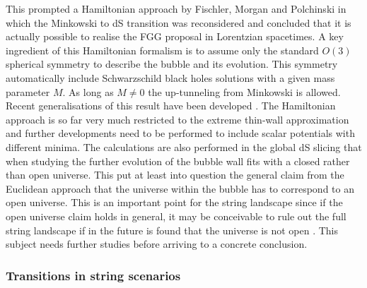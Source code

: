 \begin{itemize}
This prompted a Hamiltonian approach by Fischler, Morgan and Polchinski \cite{Fischler:1990pk} in which the Minkowski to dS transition was reconsidered and concluded that it is actually possible to realise the FGG proposal in Lorentzian spacetimes. A key ingredient of this Hamiltonian formalism is to assume only the standard $O(3)$ spherical symmetry to describe the bubble and its evolution. This symmetry automatically include Schwarzschild black holes solutions with a given mass parameter $M$. As long as $M\neq 0$ the up-tunneling from Minkowski is allowed. Recent generalisations of this result have been developed \cite{Bachlechner:2016mtp,DeAlwis:2019rxg}. The Hamiltonian approach is so far very much restricted to the extreme thin-wall approximation and further developments need to be performed to include scalar potentials with different minima. The calculations are also performed in the global dS slicing that when studying the further evolution of the bubble wall fits with a closed rather than open universe. This put at least into question the general claim from the Euclidean approach that the universe within the bubble has to correspond to an open universe. This is an important point for the string landscape since if the open universe claim holds in general, it may be conceivable to rule out the full string landscape if in the future is found that the universe is not open \cite{Dyson:2002pf, Freivogel:2005vv, Cespedes:2020xpn}. This subject needs further studies before arriving to a concrete conclusion. 

\subsubsection*{Transitions in string scenarios}


\end{itemize}
